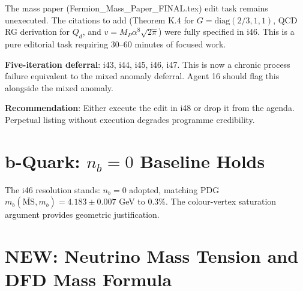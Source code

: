 \documentclass[11pt,a4paper]{article}
\newcommand{\NEW}{\textcolor{dfdblue}{\textbf{NEW}}}
\begin{document}
\begin{tcolorbox}[colback=red!5!white, colframe=red!60!black,
  title={HONEST ASSESSMENT: Mass Paper Edit Deferred for FIVE Iterations (i43--i47)}]

The mass paper (Fermion\_Mass\_Paper\_FINAL.tex) edit task remains unexecuted. The citations to add (Theorem K.4 for $G = \mathrm{diag}(2/3, 1, 1)$, QCD RG derivation for $Q_d$, and $v = M_P \alpha^8 \sqrt{2\pi}$) were fully specified in i46. This is a pure editorial task requiring 30--60 minutes of focused work.

\textbf{Five-iteration deferral}: i43, i44, i45, i46, i47. This is now a chronic process failure equivalent to the mixed anomaly deferral. Agent 16 should flag this alongside the mixed anomaly.

\textbf{Recommendation}: Either execute the edit in i48 or drop it from the agenda. Perpetual listing without execution degrades programme credibility.
\end{tcolorbox}

\section{b-Quark: $n_b = 0$ Baseline Holds}

The i46 resolution stands: $n_b = 0$ adopted, matching PDG $m_b(\overline{\text{MS}}, m_b) = 4.183 \pm 0.007$ GeV to 0.3\%. The colour-vertex saturation argument provides geometric justification.

\section{\NEW: Neutrino Mass Tension and DFD Mass Formula}
\end{document}
